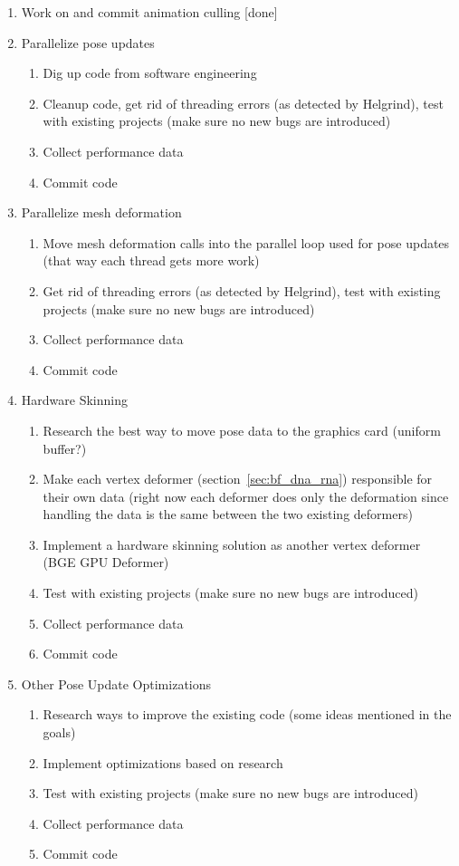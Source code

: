 \documentclass[10pt]{article}
\begin{document}
\begin{enumerate}
 \item Work on and commit animation culling [done]
 \item Parallelize pose updates
    \begin{enumerate}
     \item Dig up code from software engineering
     \item Cleanup code, get rid of threading errors (as detected by Helgrind), test with existing projects (make sure no new bugs are introduced)
     \item Collect performance data
     \item Commit code
    \end{enumerate}
 \item Parallelize mesh deformation
    \begin{enumerate}
      \item Move mesh deformation calls into the parallel loop used for pose updates (that way each thread gets more work)
      \item Get rid of threading errors (as detected by Helgrind), test with existing projects (make sure no new bugs are introduced)
      \item Collect performance data
      \item Commit code
    \end{enumerate}
 \item Hardware Skinning
    \begin{enumerate}
      \item Research the best way to move pose data to the graphics card (uniform buffer?)
      \item Make each vertex deformer (section~\ref{sec:bf_dna_rna}) responsible for their own data (right now each deformer does only the deformation since handling the data is the same between the two existing deformers)
      \item Implement a hardware skinning solution as another vertex deformer (BGE GPU Deformer)
      \item Test with existing projects (make sure no new bugs are introduced)
      \item Collect performance data
      \item Commit code
    \end{enumerate}
 \item Other Pose Update Optimizations
    \begin{enumerate}
     \item Research ways to improve the existing code (some ideas mentioned in the goals)
     \item Implement optimizations based on research
     \item Test with existing projects (make sure no new bugs are introduced)
     \item Collect performance data
     \item Commit code
    \end{enumerate}
\end{enumerate}
\end{document}
